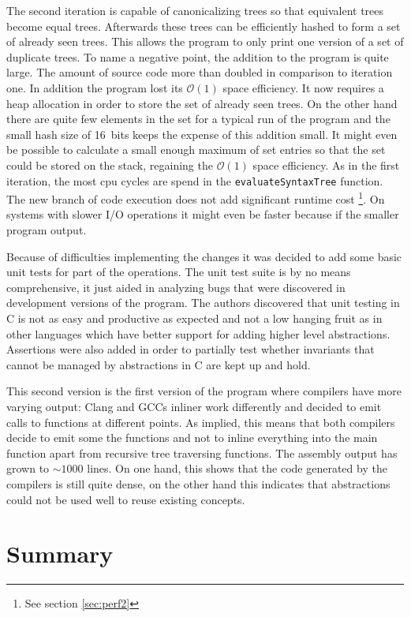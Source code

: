 \documentclass[11pt,a4paper]{article}
\newcommand{\code}[1]{\texttt{#1}}
\begin{document}
The second iteration is capable of canonicalizing trees so that
equivalent trees become equal trees.
Afterwards these trees can be efficiently hashed to form a set of
already seen trees.
This allows the program to only print one version of a set of
duplicate trees.
To name a negative point, the addition to the program is quite large.
The amount of source code more than doubled in comparison to iteration
one.
In addition the program lost its $\mathcal{O}(1)$ space efficiency.
It now requires a heap allocation in order to store the set of already
seen trees.
On the other hand there are quite few elements in the set for a
typical run of the program and the small hash size of 16~bits keeps
the expense of this addition small.
It might even be possible to calculate a small enough maximum of set
entries so that the set could be stored on the stack, regaining the
$\mathcal{O}(1)$ space efficiency.
As in the first iteration, the most cpu cycles are spend in the
\code{evaluateSyntaxTree} function.
The new branch of code execution does not add significant runtime
cost \footnote{See section \ref{sec:perf2}}.
On systems with slower I/O operations it might even be faster because
if the smaller program output.

Because of difficulties implementing the changes it was decided to add
some basic unit tests for part of the operations. The unit test suite
is by no means comprehensive, it just aided in analyzing bugs that
were discovered in development versions of the program.
The authors discovered that unit testing in C is not as easy and
productive as expected and not a low hanging fruit as in other
languages which have better support for adding higher level
abstractions.
Assertions were also added in order to partially test whether
invariants that cannot be managed by abstractions in C are kept up and
hold.

This second version is the first version of the program where
compilers have more varying output: Clang and GCCs inliner work
differently and decided to emit calls to functions at different
points. As implied, this means that both compilers decide to
emit some the functions and not to inline everything into the main
function apart from recursive tree traversing functions.
The assembly output has grown to $\sim 1000$ lines. On one hand, this
shows that the code generated by the compilers is still quite dense,
on the other hand this indicates that abstractions could not be used
well to reuse existing concepts.

\section{Summary}
\end{document}
